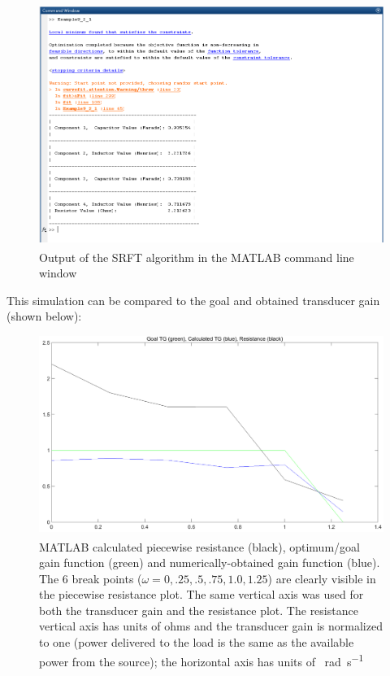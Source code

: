 \begin{figure}[H]
    \centering
    \includegraphics[width=0.8\linewidth]{../img/matlabclc.png}
    \caption{Output of the SRFT algorithm in the
    MATLAB\textsuperscript{\textregistered} command line window}
    \label{fig:matlabclc}
\end{figure}
This simulation can be compared to the goal and obtained transducer gain (shown
below):

\begin{figure}[H]
    \centering
    \includegraphics[width=.8\linewidth]{../img/OptimumGain.png}
    \caption{MATLAB\textsuperscript{\textregistered} calculated piecewise
    resistance (black), optimum/goal gain function (green) and numerically-obtained
gain function (blue). The 6 break points ($\omega = 0,.25,.5,.75,1.0,1.25$) are
clearly visible in the piecewise resistance plot. The same vertical axis was
used for both the transducer gain and the resistance plot. The resistance
vertical axis
has units of ohms and the transducer gain is normalized to one (power delivered
to the load is the same as the available power from the source); the horizontal
axis has units of \SI{}{\radian\per\second}}
    \label{fig:../img/OptimumGain}
\end{figure}

